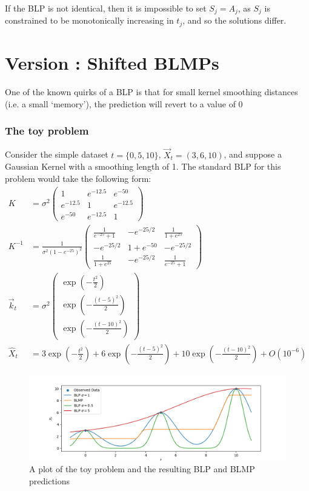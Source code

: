 \documentclass{article}
\newcounter{version}
\newcommand\attempt[1]{\stepcounter{version} \section*{Version \theversion: #1}}
\begin{document}
		If the BLP is not identical, then it is impossible to set $S_j = A_j$, as $S_j$ is constrained to be monotonically increasing in $t_j$, and so the solutions differ.
	
	\attempt{Shifted BLMPs}

		One of the known quirks of a BLP is that for small kernel smoothing distances (i.e. a small `memory'), the prediction will revert to a value of 0

		\subsubsection*{The toy problem}

			Consider the simple dataset $t = \{0,5,10\}$, $\vec{X}_t = (3,6,10)$, and suppose a Gaussian Kernel with a smoothing length of 1. The standard BLP for this problem would take the following form:
			\begin{align}
					K &= \sigma^2 \begin{pmatrix}
					1	& e^{-12.5}	& e^{-50}
					\\
					e^{-12.5} & 	1 & e^{-12.5}
					\\
					e^{-50} & e^{-12.5} & 1	
				\end{pmatrix}
				\\
				K^{-1}  &= \frac{1}{\sigma^2 (1 - e^{-25})^2} \begin{pmatrix}
					\frac{1}{e^{-25} +1}	& -e^{-25/2}	& \frac{1}{1 + e^{25}}
					\\
					-e^{-25/2} & 	1 + e^{-50} & -e^{-25/2}
					\\
					\frac{1}{1 + e^{25}} & -e^{-25/2} & \frac{1}{e^{-25} +1}
				\end{pmatrix} 
				\\
				\vec{k}_t &= \sigma^2\begin{pmatrix}
					\exp\left(-\frac{t^2}{2}\right)
					\\
					\exp\left(-\frac{(t-5)^2}{2}\right)
					\\
					\exp\left(-\frac{(t-10)^2}{2}\right)
				\end{pmatrix}
				\\
				\hat{X}_t &= 3\exp\left(-\frac{t^2}{2}\right) + 6 \exp\left(-\frac{(t-5)^2}{2}\right) + 10 \exp\left(-\frac{(t-10)^2}{2}\right) + O(10^{-6})
			\end{align}
			\begin{figure}
				\includegraphics[width=\linewidth,keepaspectratio=true]{Figs/zeroReversion.png}
				\caption{A plot of the toy problem and the resulting BLP and BLMP predictions}\label{F:ZeroRevert}
			\end{figure}
\end{document}
